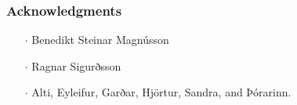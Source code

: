 \documentclass{beamer}
\begin{document}
\begin{frame}
	\frametitle{Acknowledgments}
\begin{enumerate}
\item[$\cdot$] Benedikt Steinar Magnússon
\item[$\cdot$] Ragnar Sigurðsson
\item[$\cdot$] Alti, Eyleifur, Garðar, Hjörtur, Sandra, and Þórarinn.
\end{enumerate}
\end{frame}

\begin{frame}
\end{frame}
\end{document}
